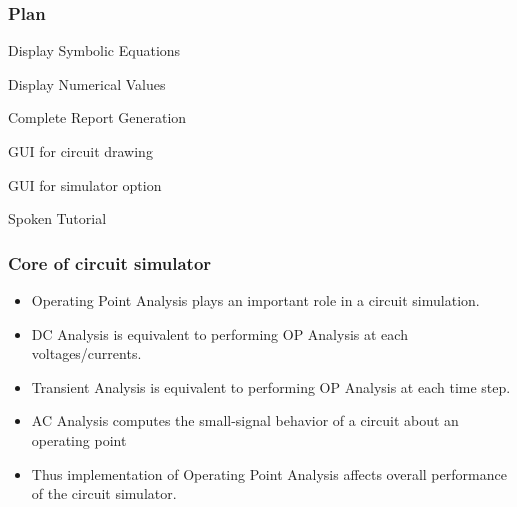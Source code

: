 \documentclass{beamer}
\begin{document}
\begin{frame}
 \frametitle{Plan}
\begin{block}{Display Symbolic Equations}
\end{block}
\begin{block}{Display Numerical Values}
\end{block}
\begin{block}{Complete Report Generation}
\end{block}
\begin{block}{GUI for circuit drawing}
\end{block}
\begin{block}{GUI for simulator option}
\end{block}
\begin{block}{Spoken Tutorial}
\end{block}
\end{frame}

\begin{frame}
 \frametitle{Core of circuit simulator}
\begin{itemize}
\item Operating Point Analysis plays an important role in a circuit simulation. 
\item DC Analysis is equivalent to performing OP Analysis at each voltages/currents. 
\item Transient Analysis is equivalent to performing OP Analysis at each time step.  
\item AC Analysis computes the small-signal behavior of a circuit about an operating point 
\item Thus implementation of Operating Point Analysis affects overall performance of the circuit simulator.
\end{itemize} 
\end{frame}
\end{document}

